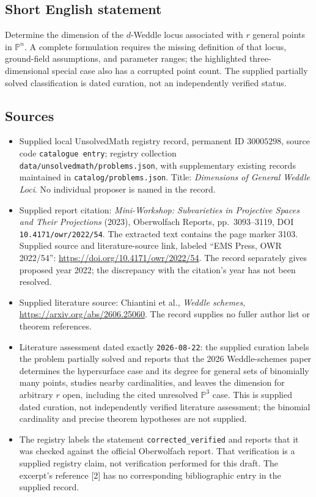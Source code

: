 \documentclass[11pt]{article}
\begin{document}
\subsection{Short English statement}
Determine the dimension of the \(d\)-Weddle locus associated with \(r\) general points in \(\mathbb P^n\). A complete formulation requires the missing definition of that locus, ground-field assumptions, and parameter ranges; the highlighted three-dimensional special case also has a corrupted point count. The supplied partially solved classification is dated curation, not an independently verified status.
\subsection{Sources}
\begin{itemize}
\item Supplied local UnsolvedMath registry record, permanent ID \(30005298\), source code \texttt{catalogue entry}; registry collection \texttt{data/unsolvedmath/problems.json}, with supplementary existing records maintained in \texttt{catalog/problems.json}. Title: \emph{Dimensions of General Weddle Loci}. No individual proposer is named in the record.
\item Supplied report citation: \emph{Mini-Workshop: Subvarieties in Projective Spaces and Their Projections} (2023), Oberwolfach Reports, pp.\ 3093--3119, DOI \texttt{10.4171/owr/2022/54}. The extracted text contains the page marker 3103. Supplied source and literature-source link, labeled ``EMS Press, OWR 2022/54'': \url{https://doi.org/10.4171/owr/2022/54}. The record separately gives proposed year 2022; the discrepancy with the citation's year has not been resolved.
\item Supplied literature source: Chiantini et al., \emph{Weddle schemes}, \url{https://arxiv.org/abs/2606.25060}. The record supplies no fuller author list or theorem references.
\item Literature assessment dated exactly \texttt{2026-08-22}: the supplied curation labels the problem partially solved and reports that the 2026 Weddle-schemes paper determines the hypersurface case and its degree for general sets of binomially many points, studies nearby cardinalities, and leaves the dimension for arbitrary \(r\) open, including the cited unresolved \(\mathbb P^3\) case. This is supplied dated curation, not independently verified literature assessment; the binomial cardinality and precise theorem hypotheses are not supplied.
\item The registry labels the statement \texttt{corrected\_verified} and reports that it was checked against the official Oberwolfach report. That verification is a supplied registry claim, not verification performed for this draft. The excerpt's reference [2] has no corresponding bibliographic entry in the supplied record.
\end{itemize}
\end{document}
